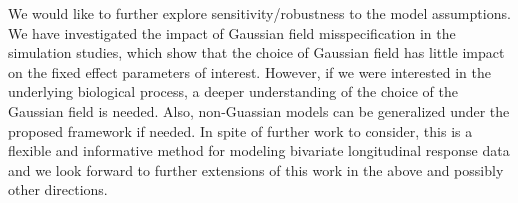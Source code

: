 \documentclass[article,lineno]{biometrika}
\def\Bka{{\it Biometrika}}
\begin{document}
We would like to further explore sensitivity/robustness to the model assumptions. We have investigated the impact of Gaussian field misspecification in the simulation studies, which show that the choice of Gaussian field has little impact on the fixed effect parameters of interest. However, if we were interested in the underlying biological process, a deeper understanding of the choice of the Gaussian field is needed. 
Also, non-Guassian models can be generalized under the proposed framework if needed.
In spite of further work to consider, this is a flexible and informative method for modeling bivariate  longitudinal response data and we look forward to further extensions of this work in the above and possibly other directions.

%
%


\appendix

%
%
\end{document}
